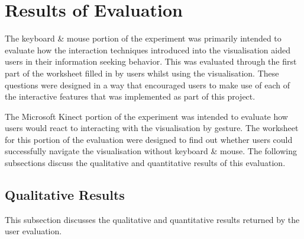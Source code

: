 \section{Results of Evaluation}
The keyboard \& mouse portion of the experiment was primarily intended to
evaluate how the interaction techniques introduced into the
visualisation aided users in their information seeking behavior.
This was evaluated through the first part of the worksheet filled
in by users whilst using the visualisation. These questions were designed in a
way that
encouraged users to make use of each of the interactive features that was
implemented as part of this project.

The Microsoft Kinect portion of the experiment was intended to evaluate how
users would react to interacting with the visualisation by gesture. The
worksheet for this portion of the evaluation were designed to find out whether
users could successfully navigate the visualisation without keyboard \& mouse.
The following subsections discuss the qualitative and quantitative results of
this evaluation. 

\subsection{Qualitative Results}
This subsection discusses the qualitative and quantitative results returned by
the user evaluation.
